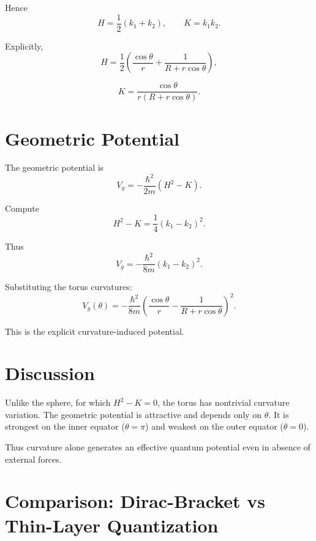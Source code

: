 \documentclass[11pt]{article}
\begin{document}
Hence
\begin{equation}
H = \frac{1}{2}(k_1 + k_2),
\qquad
K = k_1 k_2.
\end{equation}

Explicitly,
\begin{equation}
H = \frac{1}{2}\left(\frac{\cos\theta}{r} + \frac{1}{R + r \cos\theta}\right),
\end{equation}

\begin{equation}
K = \frac{\cos\theta}{r(R + r \cos\theta)}.
\end{equation}

\section{Geometric Potential}

The geometric potential is
\begin{equation}
V_g = -\frac{\hbar^2}{2m}(H^2 - K).
\end{equation}

Compute
\begin{equation}
H^2 - K = \frac{1}{4}(k_1 - k_2)^2.
\end{equation}

Thus
\begin{equation}
V_g = -\frac{\hbar^2}{8m}(k_1 - k_2)^2.
\end{equation}

Substituting the torus curvatures:
\begin{equation}
V_g(\theta) = -\frac{\hbar^2}{8m}
\left(
\frac{\cos\theta}{r} - \frac{1}{R + r \cos\theta}
\right)^2.
\end{equation}

This is the explicit curvature-induced potential.

\section{Discussion}

Unlike the sphere, for which $H^2 - K = 0$, the torus has nontrivial curvature variation. The geometric potential is attractive and depends only on $\theta$. It is strongest on the inner equator ($\theta=\pi$) and weakest on the outer equator ($\theta=0$).

Thus curvature alone generates an effective quantum potential even in absence of external forces.

\section{Comparison: Dirac-Bracket vs Thin-Layer Quantization}
\end{document}
